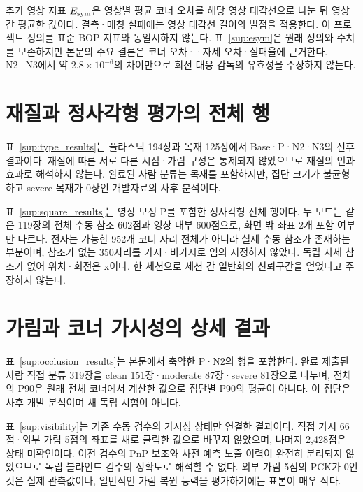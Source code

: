 \documentclass[journal,twoside,web]{ieeecolor}
\begin{document}
추가 영상 지표 $E_{\rm sym}$은 영상별 평균 코너 오차를 해당 영상 대각선으로 나눈 뒤 영상 간 평균한 값이다. 결측·매칭 실패에는 영상 대각선 길이의 벌점을 적용한다. 이 프로젝트 정의를 표준 BOP 지표와 동일시하지 않는다. 표~\ref{sup:esym}은 원래 정의와 수치를 보존하지만 본문의 주요 결론은 코너 오차·\pckten·자세 오차·실패율에 근거한다. N2−N3에서 약 $2.8\times10^{-6}$의 차이만으로 회전 대응 감독의 유효성을 주장하지 않는다.


\section{재질과 정사각형 평가의 전체 행}
표~\ref{sup:type_results}는 플라스틱 194장과 목재 125장에서 Base·P·N2·N3의 전후 결과이다. 재질에 따른 서로 다른 시점·가림 구성은 통제되지 않았으므로 재질의 인과 효과로 해석하지 않는다. 완료된 사람 분류는 목재를 포함하지만, 집단 크기가 불균형하고 severe 목재가 0장인 개발자료의 사후 분석이다.


표~\ref{sup:square_results}는 영상 보정 P를 포함한 정사각형 전체 행이다. 두 모드는 같은 119장의 전체 수동 참조 602점과 영상 내부 600점으로, 화면 밖 좌표 2개 포함 여부만 다르다. 전자는 가능한 952개 코너 자리 전체가 아니라 실제 수동 참조가 존재하는 부분이며, 참조가 없는 350자리를 가시·비가시로 임의 지정하지 않았다. 독립 자세 참조가 없어 위치·회전은 x이다. 한 세션으로 세션 간 일반화의 신뢰구간을 얻었다고 주장하지 않는다.


\section{가림과 코너 가시성의 상세 결과}
표~\ref{sup:occlusion_results}는 본문에서 축약한 P·N2의 행을 포함한다. 완료 제출된 사람 직접 분류 319장을 clean 151장·moderate 87장·severe 81장으로 나누며, 전체의 P90은 원래 전체 코너에서 계산한 값으로 집단별 P90의 평균이 아니다. 이 집단은 사후 개발 분석이며 새 독립 시험이 아니다.


표~\ref{sup:visibility}는 기존 수동 검수의 가시성 상태만 연결한 결과이다. 직접 가시 66점·외부 가림 5점의 좌표를 새로 클릭한 값으로 바꾸지 않았으며, 나머지 2,428점은 상태 미확인이다. 이전 검수의 PnP 보조와 사전 예측 노출 이력이 완전히 분리되지 않았으므로 독립 블라인드 검수의 정확도로 해석할 수 없다. 외부 가림 5점의 PCK가 0인 것은 실제 관측값이나, 일반적인 가림 복원 능력을 평가하기에는 표본이 매우 작다.

\end{document}
